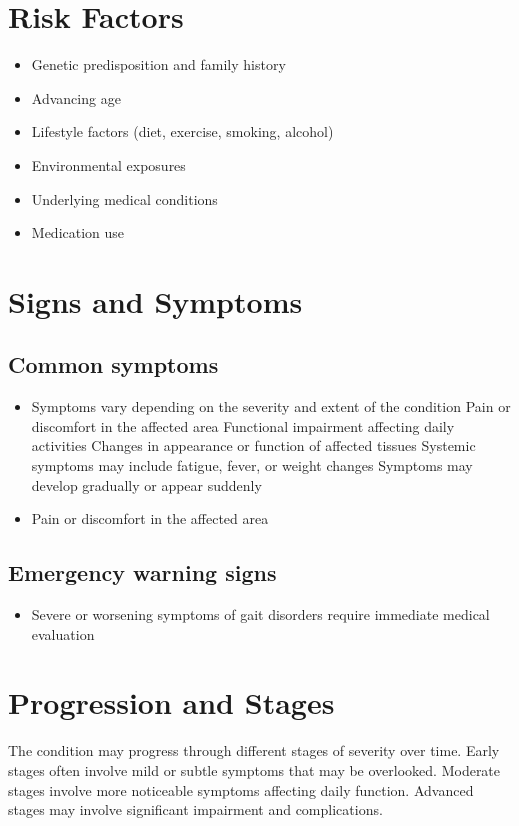 \section{Risk Factors}


\begin{itemize}[noitemsep]
  \item Genetic predisposition and family history
  \item Advancing age
  \item Lifestyle factors (diet, exercise, smoking, alcohol)
  \item Environmental exposures
  \item Underlying medical conditions
  \item Medication use
\end{itemize}
\section{Signs and Symptoms}

\subsection{Common symptoms}
\begin{itemize}[noitemsep]
  \item Symptoms vary depending on the severity and extent of the condition Pain or discomfort in the affected area Functional impairment affecting daily activities Changes in appearance or function of affected tissues Systemic symptoms may include fatigue, fever, or weight changes Symptoms may develop gradually or appear suddenly
  \item Pain or discomfort in the affected area
  \end{itemize}

\subsection{Emergency warning signs}
\begin{itemize}[noitemsep]
  \item Severe or worsening symptoms of gait disorders require immediate medical evaluation
\end{itemize}
\section{Progression and Stages}
The condition may progress through different stages of severity over time. Early stages often involve mild or subtle symptoms that may be overlooked. Moderate stages involve more noticeable symptoms affecting daily function. Advanced stages may involve significant impairment and complications.
